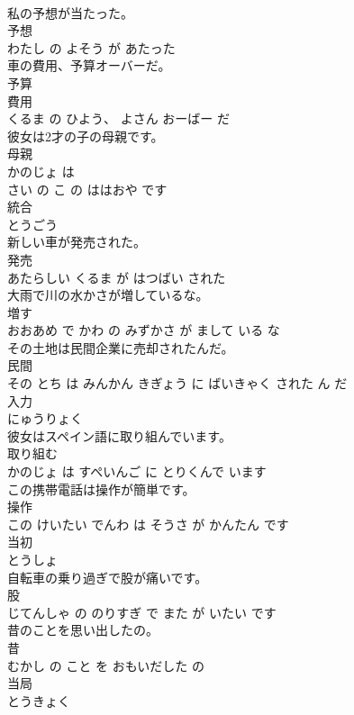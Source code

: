 \documentclass[8pt]{extreport}
\begin{document}
\begin{CJK}{UTF8}{min}
\\	私の予想が当たった。	
\\	予想 
\\	わたし の よそう が あたった			
\\	車の費用、予算オーバーだ。	
\\	予算 
\\	費用 
\\	くるま の ひよう、 よさん おーばー だ			
\\	彼女は2才の子の母親です。	
\\	母親 
\\	かのじょ は 
\\	さい の こ の ははおや です			
\\	統合	
\\	とうごう		
\\	新しい車が発売された。	
\\	発売 
\\	あたらしい くるま が はつばい された			
\\	大雨で川の水かさが増しているな。	
\\	増す 
\\	おおあめ で かわ の みずかさ が まして いる な			
\\	その土地は民間企業に売却されたんだ。	
\\	民間 
\\	その とち は みんかん きぎょう に ばいきゃく された ん だ			
\\	入力	
\\	にゅうりょく		
\\	彼女はスペイン語に取り組んでいます。	
\\	取り組む 
\\	かのじょ は すぺいんご に とりくんで います			
\\	この携帯電話は操作が簡単です。	
\\	操作 
\\	この けいたい でんわ は そうさ が かんたん です			
\\	当初	
\\	とうしょ		
\\	自転車の乗り過ぎで股が痛いです。	
\\	股 
\\	じてんしゃ の のりすぎ で また が いたい です			
\\	昔のことを思い出したの。	
\\	昔 
\\	むかし の こと を おもいだした の			
\\	当局	
\\	とうきょく		

\end{CJK}
\end{document}
